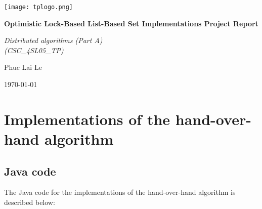\documentclass[12pt,a4paper]{article}
\newcommand{\titlestr}{Optimistic Lock-Based List-Based Set Implementations Project Report}
\newcommand{\authorstr}{Phuc Lai Le}
\begin{document}
\begin{titlepage}
  \centering
  \texttt{[image: tplogo.png]}

  \vspace{1cm}
  {\LARGE \bf{\titlestr} \par}
  
  \vspace{.5cm}
  {\LARGE {\it{Distributed algorithms (Part A)} \\ (CSC\_4SL05\_TP)} \par}

  \vspace{1cm}
  {\Large \authorstr \par}

  \vspace{1cm}

  \today

  \vfill
\end{titlepage}

\newpage

{
  \hypersetup{linkcolor=black}
  \tableofcontents
}

\newpage
\section{Implementations of the hand-over-hand algorithm}
\subsection{Java code}
The Java code for the implementations of the hand-over-hand algorithm is described below:
\end{document}

